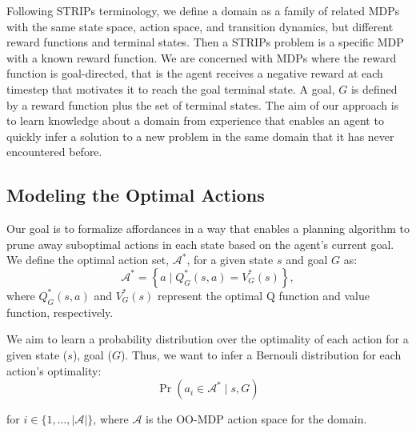 \documentclass[letterpaper]{article}
\begin{document}
Following STRIPs terminology, we define a domain as a family of
related MDPs with the same state space, action space, and transition
dynamics, but different reward functions and terminal states.  Then a
STRIPs problem is a specific MDP with a known reward function.  We are
concerned with MDPs where the reward function is goal-directed, that
is the agent receives a negative reward at each timestep that motivates
it to reach the goal terminal state.  A goal, $G$ is
defined by a reward function plus the set of terminal states.  The aim
of our approach is to learn knowledge about a domain from experience
that enables an agent to quickly infer a solution to a new problem in
the same domain that it has never encountered before.


\subsection{Modeling the Optimal Actions}

Our goal is to formalize affordances in a way that enables a planning
algorithm to prune away suboptimal actions in each state based on the
agent's current goal. We define the optimal action set,
$\mathcal{A}^*$, for a given state $s$ and goal $G$ as:
\begin{equation}
\mathcal{A}^* = \left\{ a \mid Q^*_G(s,a) = V^*_G(s) \right\}, 
\label{eq:opt_act_set}
\end{equation}
where $Q^*_G(s,a)$ and $V^*_G(s)$ represent the optimal Q function and 
value function, respectively.

We aim to learn a probability distribution over the optimality of each action
for a given state ($s$), goal ($G$). Thus, we want to infer a Bernouli
distribution for each action's optimality:
\begin{equation}
\Pr(a_i \in \mathcal{A}^* \mid s, G)
\label{eq:master}
\end{equation}

\noindent for $i \in \{1, \ldots, |\mathcal{A}|\}$, where
$\mathcal{A}$ is the OO-MDP action space for the domain.
\end{document}
